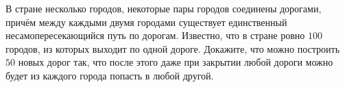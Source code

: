 В стране несколько городов, некоторые пары городов соединены дорогами, причём между каждыми двумя городами существует единственный несамопересекающийся путь по дорогам. Известно, что в стране ровно $100$ городов, из которых выходит по одной дороге. Докажите, что можно построить $50$ новых дорог так, что после этого даже при закрытии любой дороги можно будет из каждого города попасть в любой другой.